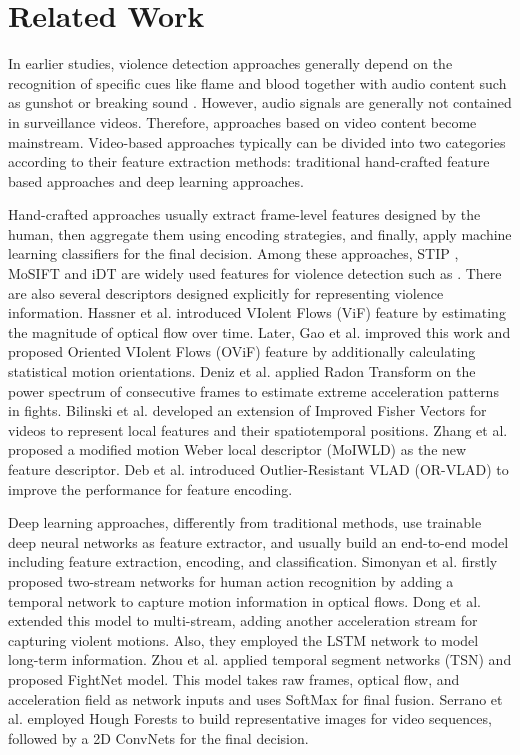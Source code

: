 \documentclass[10pt,twocolumn,letterpaper]{article}
\begin{document}

\section{Related Work}
\label{sec:2}

In earlier studies, violence detection approaches generally depend on the recognition of specific cues like flame and blood together with audio content such as gunshot or breaking sound \cite{nam1998audio, cheng2003semantic, zajdel2007cassandra}.
However, audio signals are generally not contained in surveillance videos.
Therefore, approaches based on video content become mainstream.
Video-based approaches typically can be divided into two categories according to their feature extraction methods: traditional hand-crafted feature based approaches and deep learning approaches.

Hand-crafted approaches usually extract frame-level features designed by the human, then aggregate them using encoding strategies, and finally, apply machine learning classifiers for the final decision.
Among these approaches, STIP \cite{STIPs}, MoSIFT \cite{MoSIFT} and iDT \cite{iDTs} are widely used features for violence detection such as \cite{vio_sift, hockey, mosift_sc}.
There are also several descriptors designed explicitly for representing violence information.
Hassner et al. \cite{vif} introduced VIolent Flows (ViF) feature by estimating the magnitude of optical flow over time.
Later, Gao et al. \cite{ovif} improved this work and proposed Oriented VIolent Flows (OViF) feature by additionally calculating statistical motion orientations.
Deniz et al. \cite{fast} applied Radon Transform on the power spectrum of consecutive frames to estimate extreme acceleration patterns in fights.
Bilinski et al. \cite{bilinski2016human} developed an extension of Improved Fisher Vectors for videos to represent local features and their spatiotemporal positions.
Zhang et al. \cite{MoIWLD} proposed a modified motion Weber local descriptor (MoIWLD) as the new feature descriptor.
Deb et al. \cite{vlad} introduced Outlier-Resistant VLAD (OR-VLAD) to improve the performance for feature encoding.

Deep learning approaches, differently from traditional methods, use trainable deep neural networks as feature extractor, and usually build an end-to-end model including feature extraction, encoding, and classification. 
Simonyan et al. \cite{two-stream} firstly proposed two-stream networks for human action recognition by adding a temporal network to capture motion information in optical flows.
Dong et al. \cite{dong2016multi} extended this model to multi-stream, adding another acceleration stream for capturing violent motions. Also, they employed the LSTM \cite{lstm} network to model long-term information.  
Zhou et al. \cite{zhou2017violent} applied temporal segment networks (TSN) \cite{tsn} and proposed FightNet model. This model takes raw frames, optical flow, and acceleration field as network inputs and uses SoftMax for final fusion.
Serrano et al. \cite{serrano2018fight} employed Hough Forests to build representative images for video sequences, followed by a 2D ConvNets for the final decision.
\end{document}
